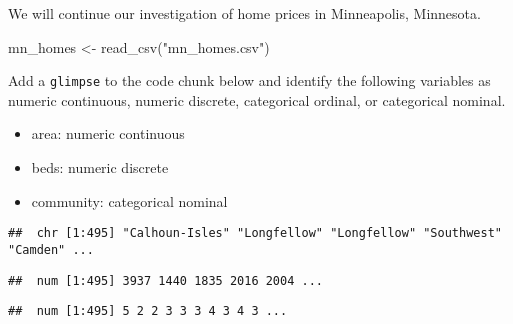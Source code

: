 \documentclass[
]{article}
\newenvironment{Shaded}{\begin{snugshade}}{\end{snugshade}}
\newcommand{\FunctionTok}[1]{\textcolor[rgb]{0.00,0.00,0.00}{#1}}
\newcommand{\NormalTok}[1]{#1}
\newcommand{\OtherTok}[1]{\textcolor[rgb]{0.56,0.35,0.01}{#1}}
\newcommand{\SpecialCharTok}[1]{\textcolor[rgb]{0.00,0.00,0.00}{#1}}
\newcommand{\StringTok}[1]{\textcolor[rgb]{0.31,0.60,0.02}{#1}}
\providecommand{\tightlist}{%
  \setlength{\itemsep}{0pt}\setlength{\parskip}{0pt}}
\begin{document}
We will continue our investigation of home prices in Minneapolis,
Minnesota.

\begin{Shaded}
\begin{Highlighting}[]
\NormalTok{mn\_homes }\OtherTok{\textless{}{-}} \FunctionTok{read\_csv}\NormalTok{(}\StringTok{"mn\_homes.csv"}\NormalTok{)}
\end{Highlighting}
\end{Shaded}

Add a \texttt{glimpse} to the code chunk below and identify the
following variables as numeric continuous, numeric discrete, categorical
ordinal, or categorical nominal.

\begin{itemize}
\tightlist
\item
  area: numeric continuous
\item
  beds: numeric discrete
\item
  community: categorical nominal
\end{itemize}

\begin{Shaded}
\end{Shaded}

\begin{verbatim}
##  chr [1:495] "Calhoun-Isles" "Longfellow" "Longfellow" "Southwest" "Camden" ...
\end{verbatim}

\begin{Shaded}
\end{Shaded}

\begin{verbatim}
##  num [1:495] 3937 1440 1835 2016 2004 ...
\end{verbatim}

\begin{Shaded}
\end{Shaded}

\begin{verbatim}
##  num [1:495] 5 2 2 3 3 3 4 3 4 3 ...
\end{verbatim}
\end{document}
